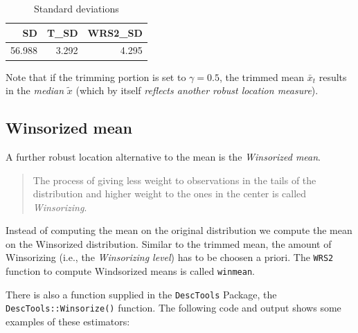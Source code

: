 \documentclass[
]{article}
\begin{document}
\begin{table}

\caption{\label{tab:TrimmedMean}Standard deviations}
\centering
\begin{tabular}[t]{rrr}
\toprule
SD & T\_SD & WRS2\_SD\\
\midrule
56.988 & 3.292 & 4.295\\
\bottomrule
\end{tabular}
\end{table}

Note that if the trimming portion is set to \(\gamma = 0.5\), the trimmed mean \(\bar{x}_t\) results in the \emph{median} \(\tilde{x}\) (which by itself \emph{reflects another robust location measure}).

\subsection*{Winsorized mean}\label{winsorized-mean}

A further robust location alternative to the mean is the \emph{Winsorized mean}.

\begin{quote}
The process of giving less weight to observations in the tails of the distribution and higher weight to the ones in the center is called \emph{Winsorizing}.
\end{quote}

Instead of computing the mean on the original distribution we compute the mean on the Winsorized distribution. Similar to the trimmed mean, the amount of Winsorizing (i.e., the \emph{Winsorizing level}) has to be choosen a priori. The \texttt{WRS2} function to compute Windsorized means is called \texttt{winmean}.

There is also a function supplied in the \texttt{DescTools} Package, the \texttt{DescTools::Winsorize()} function. The following code and output shows some examples of these estimators:
\end{document}
